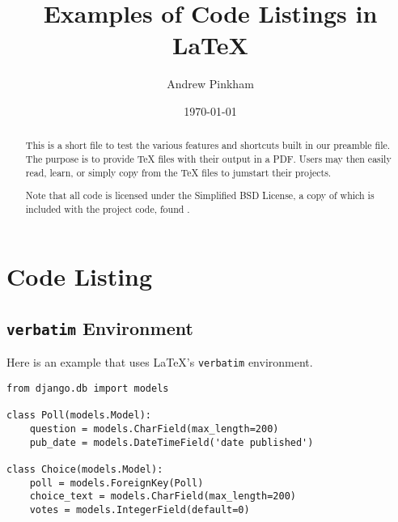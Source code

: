 


\title{Examples of Code Listings in \LaTeX{}}
\author{Andrew Pinkham} %
\date{\today}





\maketitle

\begin{abstract}
This is a short file to test the various features and shortcuts built in our preamble file. The purpose is to provide \TeX{} files with their output in a PDF. Users may then easily read, learn, or simply copy from the \TeX{} files to jumstart their projects.

Note that all code is licensed under the Simplified BSD License, a copy of which is included with the project code, found .
\end{abstract}

\tableofcontents

\section{Code Listing}

\subsection{\texttt{verbatim} Environment}

Here is an example that uses \LaTeX 's \verb|verbatim| environment.

\begin{verbatim}
from django.db import models

class Poll(models.Model):
    question = models.CharField(max_length=200)
    pub_date = models.DateTimeField('date published')

class Choice(models.Model):
    poll = models.ForeignKey(Poll)
    choice_text = models.CharField(max_length=200)
    votes = models.IntegerField(default=0)
\end{verbatim}

